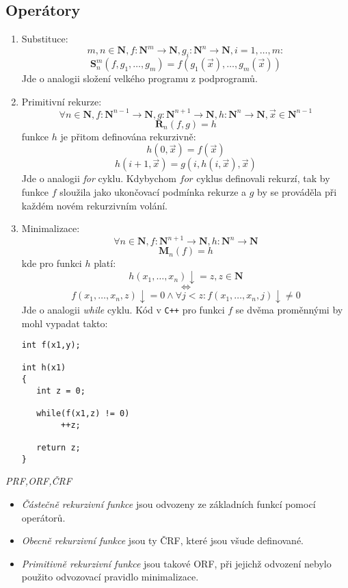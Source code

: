 \documentclass[a4paper]{article}      %
\newenvironment{definition}[1][Definice]{\begin{trivlist}
\item[\hskip \labelsep {\bfseries #1}]}{\end{trivlist}}
\begin{document}
\subsection{Operátory}
\begin{enumerate}
\item Substituce:
\[m,n \in \mathbf{N}, f:\mathbf{N}^{m}\rightarrow \mathbf{N}, g_{i}: \mathbf{N}^{n} \rightarrow \mathbf{N}, i = 1,\ldots,m:\]
\[\mathbf{S}_{n}^{m}(f,g_{1},\ldots,g_{m}) = f(g_{1}(\vec{x}),\ldots,g_{m}(\vec{x}))\]
Jde o analogii složení velkého programu z podprogramů.
\item Primitivní rekurze:
\[\forall n \in \mathbf{N}, f: \mathbf{N}^{n-1} \rightarrow \mathbf{N}, g: \mathbf{N}^{n+1}\rightarrow \mathbf{N}, h:\mathbf{N}^{n}\rightarrow \mathbf{N}, \vec{x} \in \mathbf{N}^{n-1}\]
\[\mathbf{R}_{n}(f,g) = h\]
funkce $h$ je přitom definována rekurzivně:\\ 
\[h(0,\vec{x}) = f(\vec{x})\]
\[h(i+1,\vec{x}) = g(i,h(i,\vec{x}),\vec{x})\]
Jde o analogii \emph{for} cyklu. Kdybychom $for$ cyklus definovali rekurzí, tak by funkce $f$
sloužila jako ukončovací podmínka rekurze a $g$ by se prováděla při každém novém rekurzivním volání.
\item Minimalizace:
\[\forall n \in \mathbf{N}, f:\mathbf{N}^{n+1} \rightarrow \mathbf{N}, h:\mathbf{N}^{n} \rightarrow \mathbf{N}\]
\[\mathbf{M}_{n}(f) = h\]
kde pro funkci $h$ platí:\\
\[h(x_{1},\ldots,x_{n})\downarrow = z, z \in \mathbf{N}\]
\[\Leftrightarrow\]
\[f(x_{1},\ldots,x_{n},z)\downarrow = 0 \wedge \forall j < z : f(x_{1},\ldots,x_{n},j)\downarrow \neq 0\]
Jde o analogii \emph{while} cyklu. Kód v \verb#C++# pro funkci $f$ se dvěma proměnnými by mohl vypadat takto:
\begin{verbatim}
int f(x1,y);

int h(x1)
{
   int z = 0;

   while(f(x1,z) != 0)
        ++z;
	
   return z;
}
\end{verbatim}
\end{enumerate}

\begin{definition} \emph{PRF,ORF,ČRF}
\begin{itemize}
\item \emph{Částečně rekurzivní funkce} jsou odvozeny ze základních funkcí pomocí operátorů.
\item \emph{Obecně rekurzivní funkce} jsou ty ČRF, které jsou všude definované.
\item \emph{Primitivně rekurzivní funkce} jsou takové ORF, při jejichž odvození nebylo použito odvozovací pravidlo minimalizace.
\end{itemize}
\end{definition}
\end{document}
